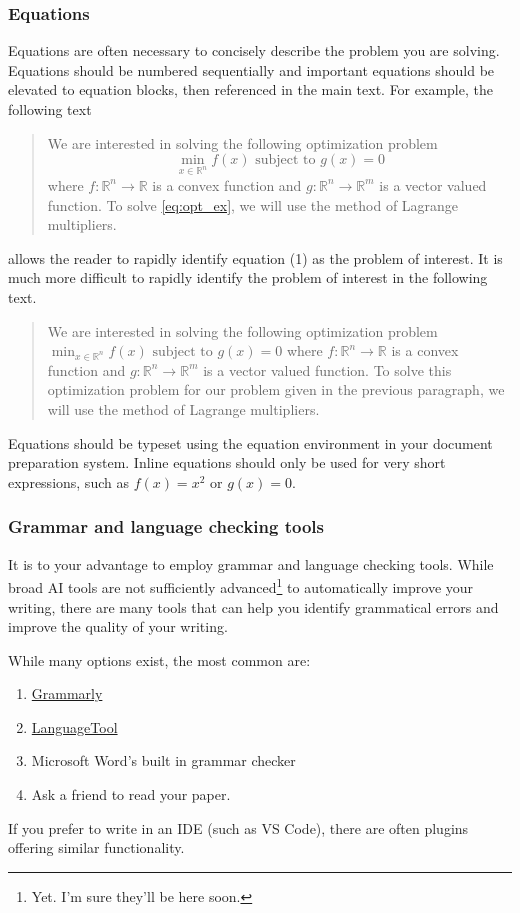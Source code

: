 \documentclass[]{article}
\begin{document}
\subsubsection{Equations}
Equations are often necessary to concisely describe the problem you are solving. Equations should be numbered sequentially and important equations should be elevated to equation blocks, then referenced in the main text. For example, the following text
\begin{quote}
    We are interested in solving the following optimization problem
    \begin{equation} \label{eq:opt_ex}
        \min_{x\in\mathbb{R}^n} f(x) \text{ subject to } g(x) = 0
    \end{equation}
    where $f:\mathbb{R}^n\to\mathbb{R}$ is a convex function and $g:\mathbb{R}^n\to\mathbb{R}^m$ is a vector valued function. To solve \eqref{eq:opt_ex}, we will use the method of Lagrange multipliers.
\end{quote}
allows the reader to rapidly identify equation (1) as the problem of interest. It is much more difficult to rapidly identify the problem of interest in the following text.
\begin{quote}
    We are interested in solving the following optimization problem
        $\min_{x\in\mathbb{R}^n} f(x) \text{ subject to } g(x) = 0$
    where $f:\mathbb{R}^n\to\mathbb{R}$ is a convex function and $g:\mathbb{R}^n\to\mathbb{R}^m$ is a vector valued function. To solve this optimization problem for our problem given in the previous paragraph, we will use the method of Lagrange multipliers.
\end{quote}
Equations should be typeset using the equation environment in your document preparation system. Inline equations should only be used for very short expressions, such as $f(x) = x^2$ or $g(x) = 0$.

\subsubsection{Grammar and language checking tools}

It is to your advantage to employ grammar and language checking tools. While broad AI tools are not sufficiently advanced\footnote{Yet. I'm sure they'll be here soon.} to automatically improve your writing, there are many tools that can help you identify grammatical errors and improve the quality of your writing.

While many options exist, the most common are:
\begin{enumerate}
    \item \href{https://www.grammarly.com/}{Grammarly}
    \item \href{https://languagetool.org/}{LanguageTool}
    \item Microsoft Word's built in grammar checker
    \item Ask a friend to read your paper.
\end{enumerate}
If you prefer to write in an IDE (such as VS Code), there are often plugins offering similar functionality.
\end{document}
